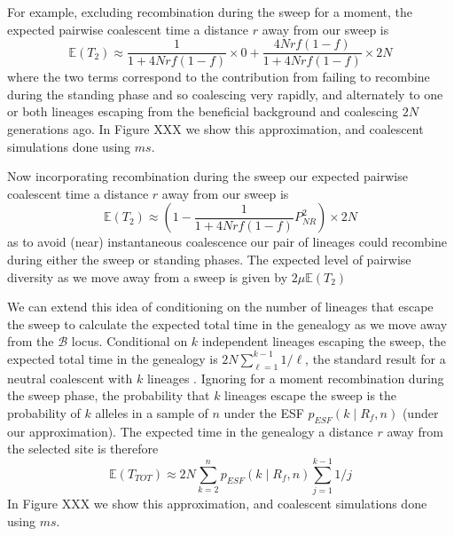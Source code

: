 \documentclass[a4paper,10pt]{article}
\newcommand{\fancyB}{$\mathcal B$ }
\begin{document}
For example, excluding recombination during the sweep for a moment, the expected pairwise coalescent time a distance $r$ away from our sweep is
\begin{equation}
	\mathbb{E}(T_2)\approx \frac{1}{1 + 4Nrf(1-f)} \times 0 + \frac{4Nrf(1-f)}{1 + 4Nrf(1-f)} \times 2N
\end{equation}
where the two terms correspond to the contribution from failing to recombine during the standing phase and so coalescing very rapidly, and alternately to one or both lineages escaping from the beneficial background and coalescing $2N$ generations ago. In Figure XXX we show this approximation, and coalescent simulations done using $ms$. 

Now incorporating recombination during the sweep our expected pairwise coalescent time a distance $r$ away from our sweep is 
\begin{equation}
	\mathbb{E}(T_2) \approx \left(1-\frac{1}{1 + 4Nrf(1-f)} P_{NR}^2  \right) \times 2N
\end{equation}
as to avoid (near) instantaneous coalescence our pair of lineages could recombine during either the sweep or standing phases. The expected level of pairwise diversity as we move away from a sweep is given by $2\mu \mathbb{E}(T_2)$

We can extend this idea of conditioning on the number of lineages that escape the sweep to calculate the expected total time in the genealogy as we move away from the \fancyB locus. Conditional on  $k$ independent lineages escaping the sweep, the expected total time in the genealogy is $2N \sum_{\ell=1}^{k-1} 1/\ell$, the standard result for a neutral coalescent with $k$ lineages \citep{Watterson}. Ignoring for a moment recombination during the sweep phase, the probability that $k$ lineages escape the sweep is the probability of $k$ alleles in a sample of $n$ under the ESF $p_{ESF}(k\mid R_f,n)$ (under our approximation). The expected time in the genealogy a distance $r$ away from the selected site is therefore
\begin{equation}
	\mathbb{E}(T_{TOT})  \approx 2N \sum_{k=2}^n p_{ESF}(k\mid R_f,n)   \sum_{j=1}^{k-1} 1/j
\end{equation}
In Figure XXX we show this approximation, and coalescent simulations done using $ms$. 

%
\end{document}
